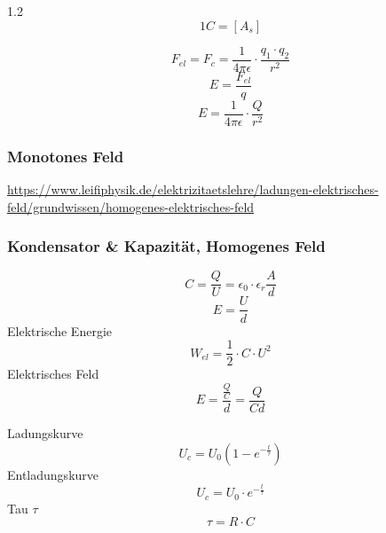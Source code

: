 \documentclass{article}
\newcommand{\Zeilenabstand}{1.2}
\begin{document}
\begin{spacing}{\Zeilenabstand}
                \begin{equation}
                    1C = [A_{s}]
                \end{equation}

                \begin{equation}
                    F_{el} = F_{c} = \frac{1}{4\pi \epsilon} \cdot \frac{q_{1}\cdot q_{2}}{r^{2}}
                \end{equation}
                \begin{equation}
                    E=\frac{F_{el}}{q}
                \end{equation}
                \begin{equation}
                    E= \frac{1}{4\pi\epsilon}\cdot \frac{Q}{r^{2}}
                \end{equation}

                \subsubsection{Monotones Feld}

                    \url{https://www.leifiphysik.de/elektrizitaetslehre/ladungen-elektrisches-feld/grundwissen/homogenes-elektrisches-feld}

				\subsubsection{Kondensator \& Kapazität, Homogenes Feld}

					\begin{equation}
						C = \frac{Q}{U} = \epsilon_{0}  \cdot \epsilon_{r} \frac{A}{d}
					\end{equation}
					\begin{equation}
						E = \frac{U}{d}
					\end{equation}
					Elektrische Energie
					\begin{equation}
						W_{el} = \frac{1}{2} \cdot C \cdot U^2
					\end{equation}
					Elektrisches Feld
					\begin{equation}
						E = \frac{\frac{Q}{C}}{d} = \frac{Q}{Cd}
					\end{equation}
					
					Ladungskurve
					\begin{equation}
						U_{c} = U_{0} (1-e^{- \frac{t}{\tau}})
					\end{equation}
					Entladungskurve
					\begin{equation}
						U_{c} = U_{0} \cdot e^{- \frac{t}{\tau}}
					\end{equation}
					Tau $\tau$
					\begin{equation}
						\tau = R \cdot C
					\end{equation}
					

\end{spacing}
\end{document}
